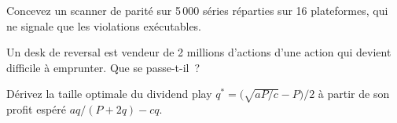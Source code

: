 \begin{interviewq}\label{iq:hf:options-cross-venue-and-volatility-arbitrage-at-speed:4}
Concevez un scanner de parité sur 5\,000 séries réparties sur 16 plateformes, qui ne signale que les violations exécutables.
\end{interviewq}

\begin{interviewq}\label{iq:hf:options-cross-venue-and-volatility-arbitrage-at-speed:5}
Un desk de reversal est vendeur de 2 millions d'actions d'une action qui devient difficile à emprunter. Que se passe-t-il~?
\end{interviewq}

\begin{interviewq}\label{iq:hf:options-cross-venue-and-volatility-arbitrage-at-speed:6}
Dérivez la taille optimale du dividend play $q^\ast=\bigl(\sqrt{aP/c}-P\bigr)/2$ à partir de son profit espéré $aq/(P+2q)-cq$.
\end{interviewq}
